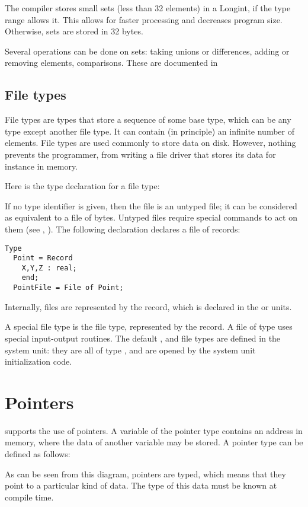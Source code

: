 The compiler stores small sets (less than 32 elements) in a Longint, if the
type range allows it. This allows for faster processing and decreases
program size. Otherwise, sets are stored in 32 bytes.

Several operations can be done on sets: taking unions or differences, adding
or removing elements, comparisons. These are documented in

%
%
\subsection{File types}
File types are types that store a sequence of some base type, which can be
any type except another file type. It can contain (in principle) an infinite
number of elements.
File types are used commonly to store data on disk. However, nothing prevents the programmer,
from writing a file driver that stores its data for instance in memory.

Here is the type declaration for a file type:

If no type identifier is given, then the file is an untyped file; it can be
considered as equivalent to a file of bytes. Untyped files require special
commands to act on them (see , ).
The following declaration declares a file of records:
\begin{verbatim}
Type
  Point = Record
    X,Y,Z : real;
    end;
  PointFile = File of Point;
\end{verbatim}
Internally, files are represented by the  record, which is
declared in the  or  units.

A special file type is the  file type, represented by the
 record. A file of type  uses special input-output
routines. The default ,  and  file
types are defined in the system unit: they are all of type , and
are opened by the system unit initialization code.

\section{Pointers}
\fpc supports the use of pointers. A variable of the pointer type
contains an address in memory, where the data of another variable may be
stored. A pointer type can be defined as follows:

As can be seen from this diagram, pointers are typed, which means that
they point to a particular kind of data. The type of this data must be
known at compile time.

